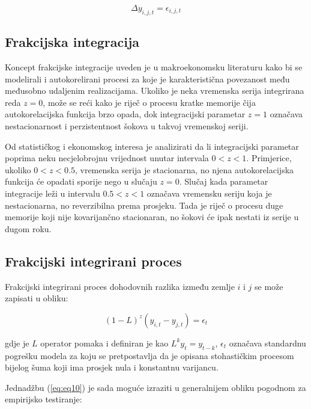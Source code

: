 \documentclass{crebsshr}
\begin{document}
\begin{equation} \label{eq:eq9}
\Delta y_{i,j,t} = \epsilon_{i,j,t}
\end{equation}

\subsection{Frakcijska integracija}

Koncept frakcijske integracije \citep{granger:80,granger:81,granger-joyeux:80,hosking:81} uveden je u makroekonomsku literaturu kako bi se modelirali i autokorelirani procesi za koje je karakteristična povezanost među međusobno udaljenim realizacijama. Ukoliko je neka vremenska serija integrirana reda \( z=0 \), može se reći kako je riječ o procesu kratke memorije čija autokorelacijska funkcija brzo opada, dok integracijski parametar \( z=1 \) označava nestacionarnost i perzistentnost šokova u takvoj vremenskoj seriji. 

Od statističkog i ekonomskog interesa je analizirati da li integracijski parametar poprima neku necjelobrojnu vrijednost unutar intervala \( 0<z<1 \). Primjerice, ukoliko \( 0<z<0.5 \), vremenska serija je stacionarna, no njena autokorelacijska funkcija će opadati sporije nego u slučaju \( z=0 \). Slučaj kada parametar integracije leži u intervalu \( 0.5<z<1 \) označava vremensku seriju koja je nestacionarna, no reverzibilna prema prosjeku. Tada je riječ o procesu duge memorije koji nije kovarijančno stacionaran, no šokovi će ipak nestati iz serije u dugom roku.

\subsection{Frakcijski integrirani proces}

Frakcijski integrirani proces dohodovnih razlika između zemlje \( i \) i \( j \) se može zapisati u obliku:

\begin{equation} \label{eq:eq10}
(1-L)^z (y_{i,t} - y_{j,t}) = \epsilon_t
\end{equation}

gdje je \( L \) operator pomaka i definiran je kao \( L^k y_t = y_{t-k} \), \( \epsilon_t \) označava standardnu pogrešku modela za koju se pretpostavlja da je opisana stohastičkim procesom bijelog šuma koji ima prosjek nula i konstantnu varijancu.

Jednadžbu (\ref{eq:eq10}) je sada moguće izraziti u generalnijem obliku pogodnom za empirijsko testiranje:
\end{document}
